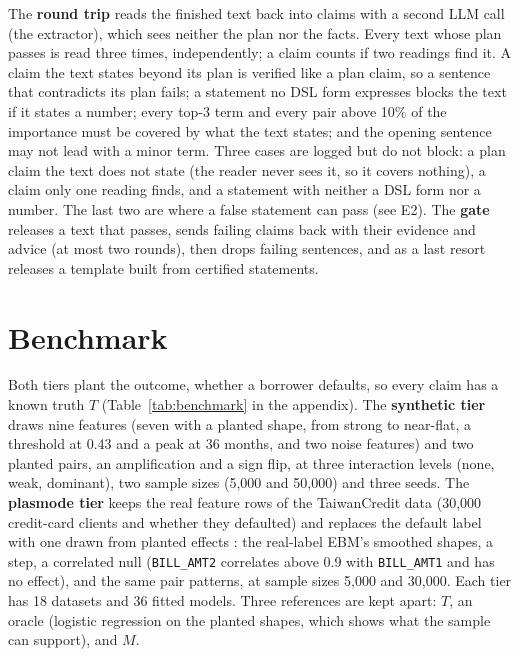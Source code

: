 \documentclass[11pt]{article}
\newcommand{\dsl}[1]{\texttt{#1}}
\begin{document}
The \textbf{round trip} reads the finished text back into claims with a second LLM call (the extractor), which sees
neither the plan nor the facts. Every text whose plan passes is read three times, independently; a claim counts if two
readings find it. A claim the text states beyond its plan is verified like a plan claim, so a sentence that
contradicts its plan fails; a statement no DSL form expresses blocks the text if it states a number; every top-3 term
and every pair above 10\% of the importance must be covered by what the text states; and the opening sentence may not
lead with a minor term. Three cases are logged but do not block: a plan claim the text does not state (the reader
never sees it, so it covers nothing), a claim only one reading finds, and a statement with neither a DSL form nor a
number. The last two are where a false statement can pass (see E2). The \textbf{gate} releases a text that passes, sends failing claims back with their evidence
and advice (at most two rounds), then drops failing sentences, and as a last resort releases a template built from
certified statements.

\begin{table}[t]
\centering\footnotesize\setlength{\tabcolsep}{4pt}
\caption{The DSL and the lexicon (global claims). The local forms used for adverse-action notices and the full
threshold table are in the appendix (Table~\ref{tab:dsl-local}).}
\label{tab:dsl}

\end{table}

\section{Benchmark}

Both tiers plant the outcome, whether a borrower defaults, so every claim has a known truth $T$
(Table~\ref{tab:benchmark} in the appendix). The
\textbf{synthetic tier} draws nine features (seven with a planted shape, from strong to near-flat, a threshold at
0.43 and a peak at 36 months, and two noise features) and two planted pairs, an amplification and a sign flip, at
three interaction levels (none, weak, dominant), two sample sizes (5,000 and 50,000) and three seeds. The
\textbf{plasmode tier} keeps the real feature rows of the TaiwanCredit data \citep{yeh2009comparisons,yeh2009uci}
(30,000 credit-card clients and whether they defaulted) and replaces the default label with one drawn from planted
effects \citep{franklin2014plasmode}: the real-label EBM's smoothed shapes, a step,
a correlated null (\dsl{BILL\_AMT2} correlates above 0.9 with \dsl{BILL\_AMT1} and has no effect), and the same pair
patterns, at sample sizes 5,000 and 30,000. Each tier has 18 datasets and 36 fitted models. Three references are kept
apart: $T$, an oracle (logistic regression on the planted shapes, which shows what the sample can support), and $M$.
\end{document}
